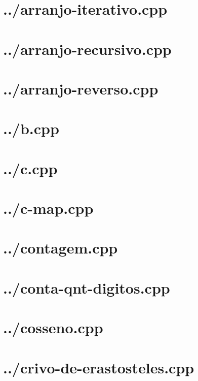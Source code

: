 \documentclass{article}
\begin{document}
\section*{../arranjo-iterativo.cpp}


\section*{../arranjo-recursivo.cpp}


\section*{../arranjo-reverso.cpp}


\section*{../b.cpp}


\section*{../c.cpp}


\section*{../c-map.cpp}


\section*{../contagem.cpp}


\section*{../conta-qnt-digitos.cpp}


\section*{../cosseno.cpp}


\section*{../crivo-de-erastosteles.cpp}

\end{document}
